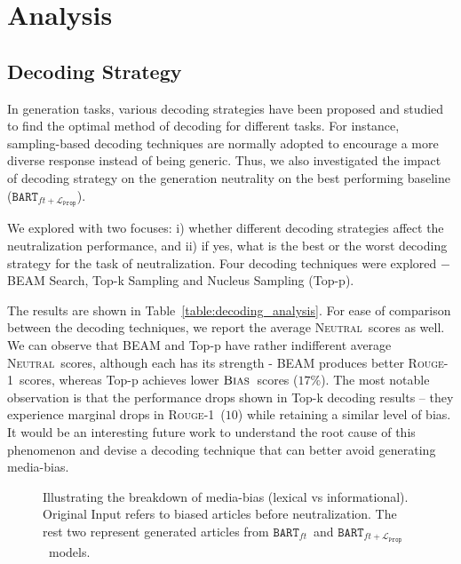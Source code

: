 \documentclass[11pt,a4paper]{article}
\newcommand{\rouge}{{\scshape Rouge-1}}
\newcommand{\all}{$\textsc{Bias}$}
\newcommand{\neutral}{\textsc{Neutral}}
\newcommand{\finetune}{$\texttt{BART}_{ft}$}
\newcommand{\prop}{$\texttt{BART}_{ft+\mathcal{L}_\texttt{Prop}}$}
\begin{document}
\section{Analysis}
\subsection{Decoding Strategy}
In generation tasks, various decoding strategies have been proposed and studied to find the optimal method of decoding for different tasks. For instance, sampling-based decoding techniques are normally adopted to encourage a more diverse response instead of being generic. Thus, we also investigated the impact of decoding strategy on the generation neutrality on the best performing baseline (\prop).

We explored with two focuses: i) whether different decoding strategies affect the neutralization performance, and ii) if yes, what is the best or the worst decoding strategy for the task of neutralization. Four decoding techniques were explored $-$ BEAM Search, Top-k Sampling and Nucleus Sampling (Top-p)\cite{holtzman2019curious}.

The results are shown in Table~\ref{table:decoding_analysis}.  
For ease of comparison between the decoding techniques, we report the average \neutral~scores as well. We can observe that BEAM and Top-p have rather indifferent average \neutral~scores, although each has its strength - BEAM produces better \rouge~scores, whereas Top-p achieves lower \all~scores ($17\%$). The most notable observation is that the performance drops shown in Top-k decoding results -- they experience marginal drops in \rouge~($10$) while retaining a similar level of bias. It would be an interesting future work to understand the root cause of this phenomenon and devise a decoding technique that can better avoid generating media-bias.

\begin{figure}[t]
    \caption{Illustrating the breakdown of media-bias (lexical vs informational). Original Input refers to biased articles before neutralization. The rest two represent generated articles from \finetune~and \prop~models.}
    \label{fig:bias_breakdown}
\end{figure}
\end{document}
